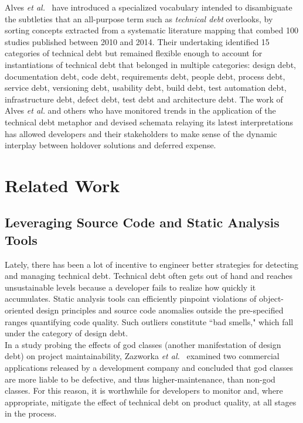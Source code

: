 Alves \textit{et al.}~\cite{alves2014towards} have introduced a specialized vocabulary intended to disambiguate the subtleties that an all-purpose term such as \textit{technical debt} overlooks, by sorting concepts extracted from a systematic literature mapping that combed 100 studies published between 2010 and 2014. Their undertaking identified 15 categories of technical debt but remained flexible enough to account for instantiations of technical debt that belonged in multiple categories: design debt, documentation debt, code debt, requirements debt, people debt, process debt, service debt, versioning debt, usability debt, build debt, test automation debt, infrastructure debt, defect debt, test debt and architecture debt. The work of Alves \textit{et al.} and others who have monitored trends in the application of the technical debt metaphor and devised schemata relaying its latest interpretations has allowed developers and their stakeholders to make sense of the dynamic interplay between holdover solutions and deferred expense.

\section{Related Work}
\label{related_work}

\subsection{Leveraging Source Code and Static Analysis Tools}

Lately, there has been a lot of incentive to engineer better strategies for detecting and managing technical debt. Technical debt often gets out of hand and reaches unsustainable levels because a developer fails to realize how quickly it accumulates. Static analysis tools can efficiently pinpoint violations of object-oriented design principles and source code anomalies outside the pre-specified ranges quantifying code quality. Such outliers constitute ``bad smells," which fall under the category of design debt.\\

In a study probing the effects of god classes (another manifestation of design debt) on project maintainability, Zazworka \textit{et al.}~\cite{zazworka2011investigating} examined two commercial applications released by a development company and concluded that god classes are more liable to be defective, and thus higher-maintenance, than non-god classes. For this reason, it is worthwhile for developers to monitor and, where appropriate, mitigate the effect of technical debt on product quality, at all stages in the process.\\

